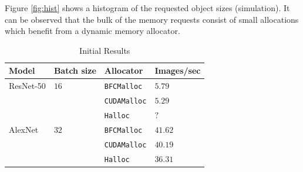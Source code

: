 \documentclass[12pt,twoside]{article}
\newcommand{\resnettimebfc}{$5.79$}     %
\newcommand{\resnettimecuda}{$5.29$}    %
\newcommand{\resnettimehalloc}{$?$}     %
\newcommand{\alexnettimebfc}{$41.62$}   %
\newcommand{\alexnettimecuda}{$40.19$}  %
\newcommand{\alexnettimehalloc}{$36.31$}%
\begin{document}
Figure \ref{fig:hist} shows a histogram of the requested object sizes (simulation). It can be observed that the bulk of the memory requests consist of small allocations which benefit from a dynamic memory allocator.

\begin{table}[!ht]
\centering
\caption{Initial Results}
\label{tab:results}
\begin{tabular}{|l|l|l|l|}
\hline
Model     & Batch size  & Allocator          & Images/sec         \\ \hline
ResNet-50 & $16$        & \texttt{BFCMalloc} & \resnettimebfc     \\ \cline{3-4} 
          &             & \texttt{CUDAMalloc}  & \resnettimecuda    \\ \cline{3-4} 
          &             & \texttt{Halloc}    & \resnettimehalloc  \\ \hline
AlexNet   & $32$        & \texttt{BFCMalloc} & \alexnettimebfc    \\ \cline{3-4} 
          &             & \texttt{CUDAMalloc}  & \alexnettimecuda   \\ \cline{3-4} 
          &             & \texttt{Halloc}    & \alexnettimehalloc \\ \hline
\end{tabular}
\end{table}
\end{document}
